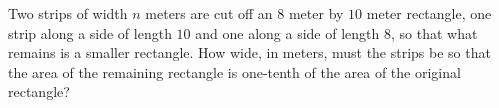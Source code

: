 Two strips of width $n$ meters are cut off an $8$ meter by $10$ meter rectangle, one strip along a side of length $10$ and one along a side of length $8$, so that what remains is a smaller rectangle. How wide, in meters, must the strips be so that the area of the remaining rectangle is one-tenth of the area of the original rectangle?
